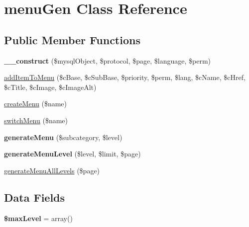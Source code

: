 \hypertarget{classmenu_gen}{\section{menu\-Gen Class Reference}
\label{classmenu_gen}
}
\subsection*{Public Member Functions}
\begin{DoxyCompactItemize}
\item 
\hypertarget{classmenu_gen_ab2aa38e2757698073a9287059cf6cdba}{{\bfseries \-\_\-\-\_\-construct} (\$mysql\-Object, \$protocol, \$page, \$language, \$perm)}\label{classmenu_gen_ab2aa38e2757698073a9287059cf6cdba}

\item 
\hyperlink{classmenu_gen_ac188b81651695587a07ab3942871b244}{add\-Item\-To\-Menu} (\$c\-Base, \$c\-Sub\-Base, \$priority, \$perm, \$lang, \$c\-Name, \$c\-Href, \$c\-Title, \$c\-Image, \$c\-Image\-Alt)
\item 
\hyperlink{classmenu_gen_ad93ad5cfde55e9828416fe8e2fdb7b74}{create\-Menu} (\$name)
\item 
\hyperlink{classmenu_gen_a4009d0ea1a4ab80c3f19cb41bd457023}{switch\-Menu} (\$name)
\item 
\hypertarget{classmenu_gen_abebfe757962c5f97af6050764d680708}{{\bfseries generate\-Menu} (\$subcategory, \$level)}\label{classmenu_gen_abebfe757962c5f97af6050764d680708}

\item 
\hypertarget{classmenu_gen_a3c6b377051cfce54d0bc885ea61c7b7e}{{\bfseries generate\-Menu\-Level} (\$level, \$limit, \$page)}\label{classmenu_gen_a3c6b377051cfce54d0bc885ea61c7b7e}

\item 
\hyperlink{classmenu_gen_ae1715ef46ba484bce82b56ccd723c230}{generate\-Menu\-All\-Levels} (\$page)
\end{DoxyCompactItemize}
\subsection*{Data Fields}
\begin{DoxyCompactItemize}
\item 
\hypertarget{classmenu_gen_a3b6785d06028312e5e87edeb9363cdb1}{{\bfseries \$max\-Level} = array()}\label{classmenu_gen_a3b6785d06028312e5e87edeb9363cdb1}

\end{DoxyCompactItemize}
